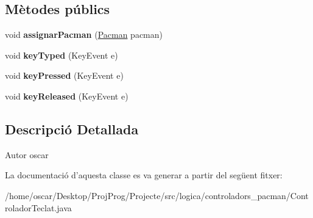 \subsection*{Mètodes públics}
\begin{DoxyCompactItemize}
\item 
\hypertarget{classlogica_1_1controladors__pacman_1_1_controlador_teclat_aab737c00c32133c65fafe6222c1eeb96}{void {\bfseries assignar\+Pacman} (\hyperlink{classlogica_1_1_pacman}{Pacman} pacman)}\label{classlogica_1_1controladors__pacman_1_1_controlador_teclat_aab737c00c32133c65fafe6222c1eeb96}

\item 
\hypertarget{classlogica_1_1controladors__pacman_1_1_controlador_teclat_af77e9d281ff2d126ef0f9a0cc88b5ec6}{void {\bfseries key\+Typed} (Key\+Event e)}\label{classlogica_1_1controladors__pacman_1_1_controlador_teclat_af77e9d281ff2d126ef0f9a0cc88b5ec6}

\item 
\hypertarget{classlogica_1_1controladors__pacman_1_1_controlador_teclat_a0681f6a89077acfc27c9934ae5a446b7}{void {\bfseries key\+Pressed} (Key\+Event e)}\label{classlogica_1_1controladors__pacman_1_1_controlador_teclat_a0681f6a89077acfc27c9934ae5a446b7}

\item 
\hypertarget{classlogica_1_1controladors__pacman_1_1_controlador_teclat_ac6f43e2b1c35c8878e4d22577cd9210d}{void {\bfseries key\+Released} (Key\+Event e)}\label{classlogica_1_1controladors__pacman_1_1_controlador_teclat_ac6f43e2b1c35c8878e4d22577cd9210d}

\end{DoxyCompactItemize}


\subsection{Descripció Detallada}
\begin{DoxyAuthor}{Autor}
oscar 
\end{DoxyAuthor}


La documentació d'aquesta classe es va generar a partir del següent fitxer\+:\begin{DoxyCompactItemize}
\item 
/home/oscar/\+Desktop/\+Proj\+Prog/\+Projecte/src/logica/controladors\+\_\+pacman/Controlador\+Teclat.\+java\end{DoxyCompactItemize}
